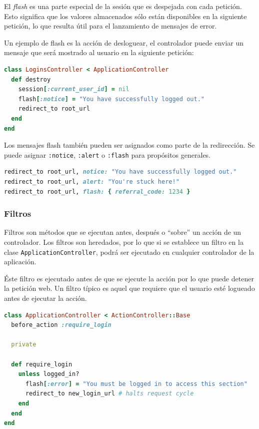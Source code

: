 El \textit{flash} es una parte especial de la sesión que es despejada con cada petición. Esto significa que los valores almacenados sólo están disponibles en la siguiente petición, lo que resulta útil para el lanzamiento de mensajes de error.

Un ejemplo de flash es la acción de desloguear, el controlador puede enviar un mensaje que será mostrado al usuario en la siguiente petición:

\begin{lstlisting}[language=Ruby]
class LoginsController < ApplicationController
  def destroy
    session[:current_user_id] = nil
    flash[:notice] = "You have successfully logged out."
    redirect_to root_url
  end
end
\end{lstlisting} 

Los mensajes flash también pueden ser asignados como parte de la redirección. Se puede asignar \texttt{:notice}, \texttt{:alert} o \texttt{:flash} para propósitos generales.

\begin{lstlisting}[language=Ruby]
redirect_to root_url, notice: "You have successfully logged out."
redirect_to root_url, alert: "You're stuck here!"
redirect_to root_url, flash: { referral_code: 1234 }
\end{lstlisting}


\subsubsection{Filtros}
Filtros son métodos que se ejecutan antes, después o ``sobre'' un acción de un controlador. Los filtros son heredados, por lo que si se establece un filtro en la clase \texttt{ApplicationController}, podrá ser ejecutado en cualquier controlador de la aplicación.

Éste filtro es ejecutado antes de que se ejecute la acción por lo que puede detener la petición web. Un filtro típico es aquel que requiere que el usuario esté logueado antes de ejecutar la acción. 

\begin{lstlisting}[language=Ruby]
class ApplicationController < ActionController::Base
  before_action :require_login
 
  private
 
  def require_login
    unless logged_in?
      flash[:error] = "You must be logged in to access this section"
      redirect_to new_login_url # halts request cycle
    end
  end
end
\end{lstlisting}

